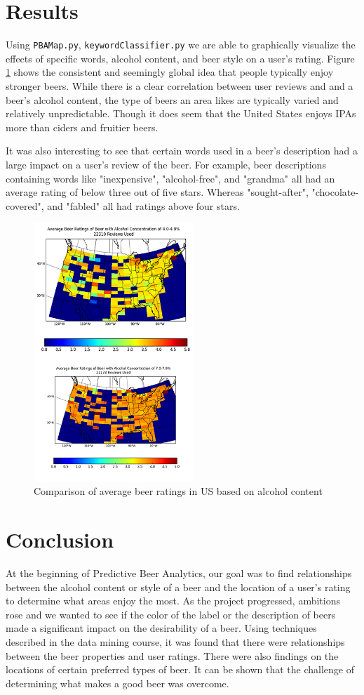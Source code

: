 \documentclass[10pt]{IEEEtran}
\begin{document}
\section{Results}

 Using \texttt{PBAMap.py}, \texttt{keywordClassifier.py} we are able to graphically visualize the effects of specific words, alcohol content, and beer style on a user's rating. Figure \ref{fig:abvcomp} shows the consistent and seemingly global idea that people typically enjoy stronger beers. While there is a clear correlation between user reviews and and a beer's alcohol content, the type of beers an area likes are typically varied and relatively unpredictable. Though it does seem that the United States enjoys IPAs more than ciders and fruitier beers.

It was also interesting to see that certain words used in a beer's description had a large impact on a user's review of the beer. For example, beer descriptions containing words like "inexpensive", "alcohol-free", and "grandma" all had an average rating of below three out of five stars. Whereas "sought-after", "chocolate-covered", and "fabled" all had ratings above four stars.

\begin{figure}[t]
  \centering
  \includegraphics[width=6cm]{./graphics/abvComp.png}
  \caption{Comparison of average beer ratings in US based on alcohol content}
  \label{fig:abvcomp}
\end{figure}

\section{Conclusion}
At the beginning of Predictive Beer Analytics, our goal was to find relationships between the alcohol content or style of a beer and the location of a user's rating to determine what areas enjoy the most. As the project progressed, ambitions rose and we wanted to see if the color of the label or the description of beers made a significant impact on the desirability of a beer. Using techniques described in the data mining course, it was found that there were relationships between the beer properties and user ratings. There were also findings on the locations of certain preferred types of beer. It can be shown that the challenge of determining what makes a good beer was overcome.
\end{document}
